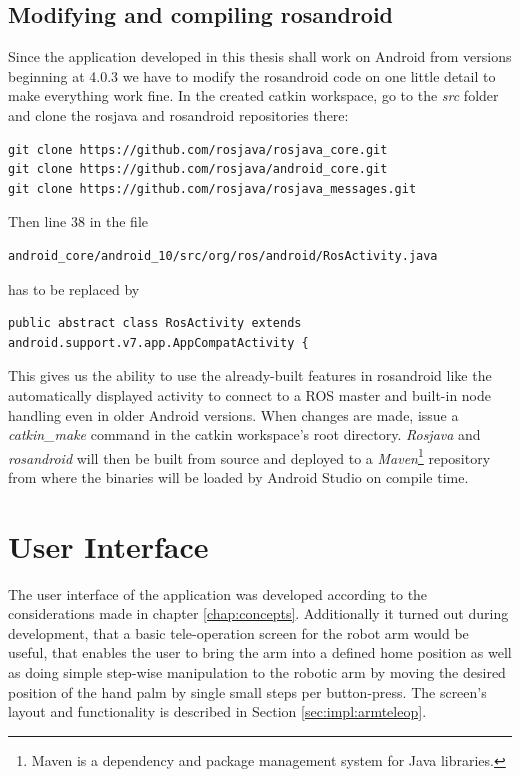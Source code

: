 \subsection{Modifying and compiling rosandroid}
\label{impl:compiling_rosandroid}

Since the application developed in this thesis shall work on Android from versions beginning at 4.0.3 we have to modify the rosandroid code on one little detail to make everything work fine. In the created catkin workspace, go to the \textit{src} folder and clone the rosjava and rosandroid repositories there:
\begin{lstlisting}[caption={Cloning the rosandroid and rosjava repositories}]
git clone https://github.com/rosjava/rosjava_core.git
git clone https://github.com/rosjava/android_core.git
git clone https://github.com/rosjava/rosjava_messages.git
\end{lstlisting}

Then line 38 in the file
\begin{lstlisting}[numbers=none]
android_core/android_10/src/org/ros/android/RosActivity.java
\end{lstlisting}

has to be replaced by

\begin{lstlisting}[caption={Change to make to RosActivity.java},firstnumber=38]
public abstract class RosActivity extends android.support.v7.app.AppCompatActivity {
\end{lstlisting}

This gives us the ability to use the already-built features in rosandroid like the automatically displayed activity to connect to a ROS master and built-in node handling even in older Android versions. When changes are made, issue a \textit{catkin\_make} command in the catkin workspace's root directory. \textit{Rosjava} and \textit{rosandroid} will then be built from source and deployed to a \textit{Maven}\footnote{Maven is a dependency and package management system for Java libraries.} repository from where the binaries will be loaded by Android Studio on compile time.

\section{User Interface}
\label{sec:impl:ui}

The user interface of the application was developed according to the considerations made in chapter \ref{chap:concepts}. Additionally it turned out during development, that a basic tele-operation screen for the robot arm would be useful, that enables the user to bring the arm into a defined home position as well as doing simple step-wise manipulation to the robotic arm by moving the desired position of the hand palm by single small steps per button-press. The screen's layout and functionality is described in Section \ref{sec:impl:armteleop}.

